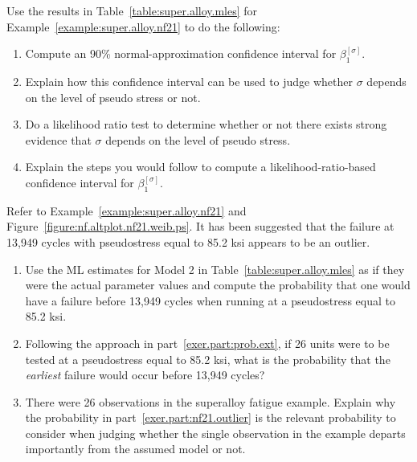 \begin{exercise}
Use the results in Table~\ref{table:super.alloy.mles}
for Example~\ref{example:super.alloy.nf21} to do the following: 
\begin{enumerate}
\item
\label{exer.part:nc.sig.beta.ci}
Compute an 90\% normal-approximation confidence interval for
$\beta_{1}^{[\sigma]}$.
\item
Explain how this confidence interval can be used to judge whether
$\sigma$ depends on the level of pseudo stress or not.
\item
Do a likelihood ratio test to determine whether or not there exists strong
evidence that $\sigma$ depends on the level of pseudo stress.
\item
Explain the steps you would follow to compute a likelihood-ratio-based
confidence interval for $\beta_{1}^{[\sigma]}$.
\end{enumerate}
\end{exercise}

\begin{exercise1}
\label{exercise:outlier.test}
Refer to Example~\ref{example:super.alloy.nf21} and
Figure~\ref{figure:nf.altplot.nf21.weib.ps}. 
It has been suggested that the failure at 13,949 cycles with
pseudostress equal to 85.2 ksi appears to be an outlier.
\begin{enumerate}
\item
\label{exer.part:prob.ext}
Use the ML estimates for Model 2 in
Table~\ref{table:super.alloy.mles} as if they were 
the actual parameter values and  compute the probability
that one would have a failure before 13,949 cycles when running at 
a pseudostress equal to 85.2 ksi.
\item
\label{exer.part:nf21.outlier}
Following the approach in part~\ref{exer.part:prob.ext}, if 26 units
were to be tested at a pseudostress equal to 85.2 ksi, what is the
probability that the {\em earliest} failure would occur before 13,949
cycles?
\item
There were 26 observations in the superalloy fatigue example. Explain
why the probability in part~\ref{exer.part:nf21.outlier} is the
relevant probability to consider when judging whether the single
observation in the example departs importantly from the assumed model
or not.
\end{enumerate}
\end{exercise1}

